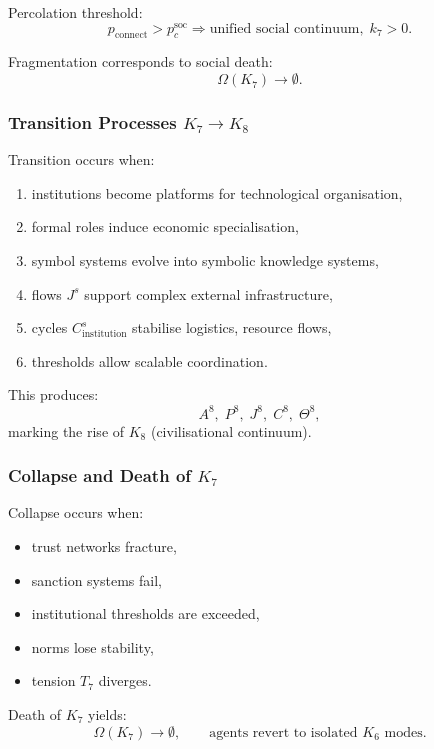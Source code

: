 Percolation threshold:
\[
p_{\text{connect}} > p_c^{\text{soc}} \Rightarrow
\text{unified social continuum},\; k_7>0.
\]

Fragmentation corresponds to social death:
\[
\Omega(K_7) \to \emptyset.
\]

\subsubsection{Transition Processes \texorpdfstring{$K_7 \to K_8$}{K_7 \to K_8}}

Transition occurs when:
\begin{enumerate}
    \item institutions become platforms for technological organisation,
    \item formal roles induce economic specialisation,
    \item symbol systems evolve into symbolic knowledge systems,
    \item flows $J^s$ support complex external infrastructure,
    \item cycles $C^s_{\text{institution}}$ stabilise logistics, resource flows,
    \item thresholds allow scalable coordination.
\end{enumerate}

This produces:
\[
A^8,\; P^8,\; J^8,\; C^8,\; \Theta^8,
\]
marking the rise of $K_8$ (civilisational continuum).

\subsubsection{Collapse and Death of \texorpdfstring{$K_7$}{K_7}}

Collapse occurs when:
\begin{itemize}
    \item trust networks fracture,
    \item sanction systems fail,
    \item institutional thresholds are exceeded,
    \item norms lose stability,
    \item tension $T_7$ diverges.
\end{itemize}

Death of $K_7$ yields:
\[
\Omega(K_7)\to\emptyset,
\qquad
\text{agents revert to isolated }K_6\text{ modes}.
\]

